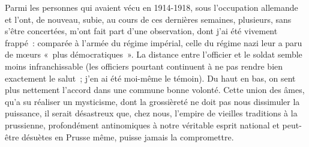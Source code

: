 \documentclass[french,twoside]{book} %
\begin{document}
Parmi les personnes qui avaient vécu en   1914-1918, sous l’occupation allemande et l’ont, de nouveau, subie, au cours de ces dernières semaines, plusieurs, sans s’être concertées, m’ont fait part d’une observation, dont j’ai été vivement frappé : comparée à l’armée du régime impérial, celle du régime nazi leur a paru de mœurs « plus démocratiques ». La distance entre l’officier et le soldat semble moins infranchissable (les officiers pourtant continuent à ne pas rendre bien exactement le salut ; j’en ai été moi-même le témoin). Du haut en bas, on sent plus nettement l’accord dans une commune bonne volonté. Cette union des âmes, qu’a su réaliser un mysticisme, dont la grossièreté ne doit pas nous dissimuler la puissance, il serait désastreux que, chez nous, l’empire de vieilles traditions à la prussienne, profondément antinomiques à notre véritable esprit national et peut-être désuètes en Prusse même, puisse jamais la compromettre.\par
\end{document}
